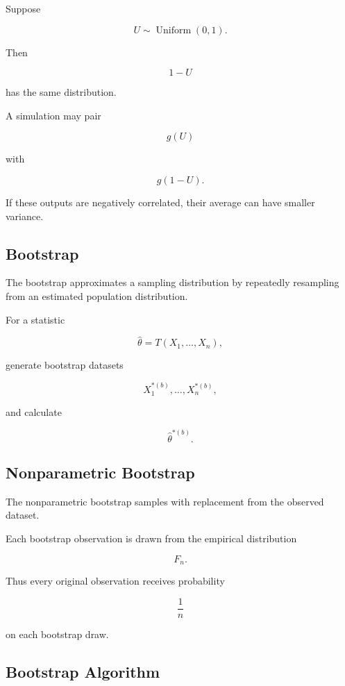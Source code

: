 Suppose

\[
U
\sim
\operatorname{Uniform}(0,1).
\]

Then

\[
1-U
\]

has the same distribution.

A simulation may pair

\[
g(U)
\]

with

\[
g(1-U).
\]

If these outputs are negatively correlated, their average can have
smaller variance.

\subsection{Bootstrap}
\label{subsec:bootstrap}

The bootstrap approximates a sampling distribution by repeatedly
resampling from an estimated population distribution.

For a statistic

\[
\widehat{\theta}
=
T(X_1,\ldots,X_n),
\]

generate bootstrap datasets

\[
\boxed{
X_1^{*(b)},
\ldots,
X_n^{*(b)},
}
\]

and calculate

\[
\boxed{
\widehat{\theta}^{*(b)}.
}
\]

\subsection{Nonparametric Bootstrap}
\label{subsec:nonparametric-bootstrap}

The nonparametric bootstrap samples with replacement from the observed
dataset.

Each bootstrap observation is drawn from the empirical distribution

\[
\boxed{
F_n.
}
\]

Thus every original observation receives probability

\[
\boxed{
\frac1n
}
\]

on each bootstrap draw.

\subsection{Bootstrap Algorithm}
\label{subsec:bootstrap-algorithm}

